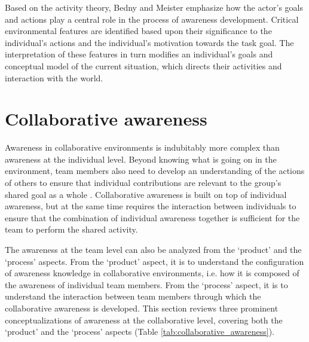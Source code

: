 Based on the activity theory, Bedny and Meister emphasize how the actor's goals and actions play a central role in the process of awareness development. Critical environmental features are identified based upon their significance to the individual's actions and the individual's motivation towards the task goal. The interpretation of these features in turn modifies an individual's goals and conceptual model of the current situation, which directs their activities and interaction with the world.

\section{Collaborative awareness} %
\label{sec:awareness_in_collaboration}
Awareness in collaborative environments is indubitably more complex than awareness at the individual level. Beyond knowing what is going on in the environment, team members also need to develop an understanding of the actions of others to ensure that individual contributions are relevant to the group's shared goal as a whole \cite{dourish1992awareness}. Collaborative awareness is built on top of individual awareness, but at the same time requires the interaction between individuals to ensure that the combination of individual awareness together is sufficient for the team to perform the shared activity.

The awareness at the team level can also be analyzed from the `product' and the `process' aspects. From the `product' aspect, it is to understand the configuration of awareness knowledge in collaborative environments, i.e. how it is composed of the awareness of individual team members. From the `process' aspect, it is to understand the interaction between team members through which the collaborative awareness is developed. This section reviews three prominent conceptualizations of awareness at the collaborative level, covering both the `product' and the `process' aspects (Table \ref{tab:collaborative_awareness}).

